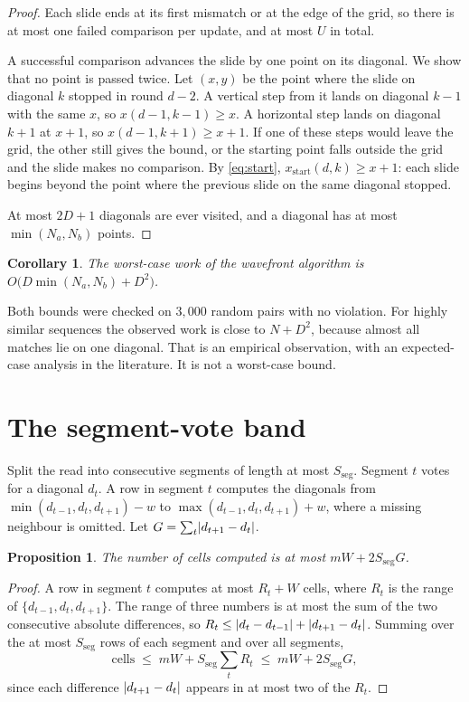 \documentclass[11pt]{article}
\theoremstyle{plain}
\newtheorem{proposition}[theorem]{Proposition}
\newtheorem{corollary}[theorem]{Corollary}
\theoremstyle{definition}
\theoremstyle{remark}
\DeclarePairedDelimiter{\abs}{\lvert}{\rvert}
\newcommand{\Sseg}{S_{\mathrm{seg}}}
\begin{document}
\begin{proof}
Each slide ends at its first mismatch or at the edge of the grid, so there is at
most one failed comparison per update, and at most $U$ in total.

A successful comparison advances the slide by one point on its diagonal. We show
that no point is passed twice. Let $(x,y)$ be the point where the slide on
diagonal $k$ stopped in round $d - 2$. A vertical step from it lands on diagonal
$k - 1$ with the same $x$, so $x(d-1,k-1) \ge x$. A horizontal step lands on
diagonal $k + 1$ at $x + 1$, so $x(d-1,k+1) \ge x + 1$. If one of these steps
would leave the grid, the other still gives the bound, or the starting point
falls outside the grid and the slide makes no comparison. By \eqref{eq:start},
$x_{\mathrm{start}}(d,k) \ge x + 1$: each slide begins beyond the point where
the previous slide on the same diagonal stopped.

At most $2D + 1$ diagonals are ever visited, and a diagonal has at most
$\min(N_a, N_b)$ points.
\end{proof}

\begin{corollary}\label{cor:wfcost}
The worst-case work of the wavefront algorithm is
$O\bigl(D\min(N_a,N_b) + D^2\bigr)$.
\end{corollary}

Both bounds were checked on $3{,}000$ random pairs with no violation. For highly
similar sequences the observed work is close to $N + D^2$, because almost all
matches lie on one diagonal. That is an empirical observation, with an
expected-case analysis in the literature. It is not a worst-case bound.

\section{The segment-vote band}

Split the read into consecutive segments of length at most $\Sseg$. Segment $t$
votes for a diagonal $d_t$. A row in segment $t$ computes the diagonals from
$\min(d_{t-1},d_t,d_{t+1}) - w$ to $\max(d_{t-1},d_t,d_{t+1}) + w$, where a
missing neighbour is omitted. Let $G = \sum_t \abs{d_{t+1} - d_t}$.

\begin{proposition}\label{prop:segment}
The number of cells computed is at most $mW + 2\Sseg G$.
\end{proposition}

\begin{proof}
A row in segment $t$ computes at most $R_t + W$ cells, where $R_t$ is the range
of $\{d_{t-1}, d_t, d_{t+1}\}$. The range of three numbers is at most the sum of
the two consecutive absolute differences, so
$R_t \le \abs{d_t - d_{t-1}} + \abs{d_{t+1} - d_t}$. Summing over the at most
$\Sseg$ rows of each segment and over all segments,
\[
\text{cells} \;\le\; mW + \Sseg \sum_t R_t \;\le\; mW + 2\Sseg G ,
\]
since each difference $\abs{d_{t+1} - d_t}$ appears in at most two of the $R_t$.
\end{proof}
\end{document}
